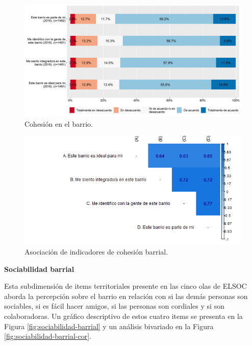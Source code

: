 \documentclass[
  12pt,
]{book}
\begin{document}
\begin{figure}[H]

{\centering \includegraphics[width=1\linewidth,height=1\textheight]{output/graphs/cohesion-barrial} 

}

\caption{Cohesión en el barrio.}\label{fig:cohesion-barrial}
\end{figure}

\begin{figure}[H]

{\centering \includegraphics[width=1\linewidth,height=1\textheight]{output/graphs/cohesion-barrial_cor} 

}

\caption{Asociación de indicadores de cohesión barrial.}\label{fig:cohesion-barrial-cor}
\end{figure}

\textbf{Sociabilidad barrial}

Esta subdimensión de items territoriales presente en las cinco olas de ELSOC aborda la percepción sobre el barrio en relación con si las demás personas son sociables, si es fácil hacer amigos, si las personas son cordiales y si son colaboradoras. Un gráfico descriptivo de estos cuatro items se presenta en la Figura \ref{fig:sociabilidad-barrial} y un análisis bivariado en la Figura \ref{fig:sociabilidad-barrial-cor}.
\end{document}
